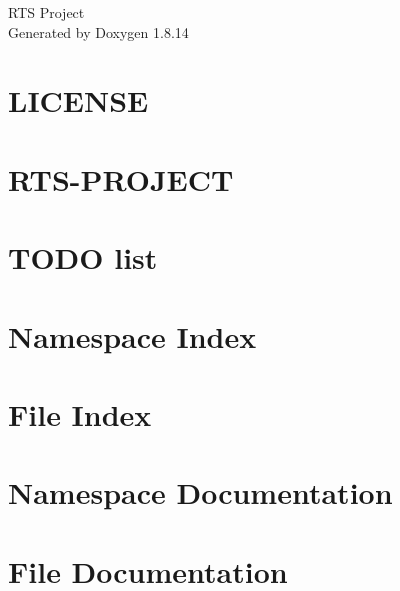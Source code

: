 \documentclass[twoside]{book}
\newcommand{\+}{\discretionary{\mbox{\scriptsize$\hookleftarrow$}}{}{}}
\newcommand{\clearemptydoublepage}{%
  \newpage{\pagestyle{empty}\cleardoublepage}%
}
\begin{document}
\begin{titlepage}
\vspace*{7cm}
\begin{center}%
{\Large R\+TS Project }\\
\vspace*{1cm}
{\large Generated by Doxygen 1.8.14}\\
\end{center}
\end{titlepage}
\clearemptydoublepage
{}
\tableofcontents
\clearemptydoublepage
{}

\chapter{L\+I\+C\+E\+N\+SE}
\label{md__l_i_c_e_n_s_e}

\chapter{R\+T\+S-\/\+P\+R\+O\+J\+E\+CT}
\label{md__r_e_a_d_m_e}

\chapter{T\+O\+DO list}
\label{md_todo}

\chapter{Namespace Index}

\chapter{File Index}

\chapter{Namespace Documentation}


















\chapter{File Documentation}





















\backmatter
\newpage
{}
\clearemptydoublepage
{}
\printindex
\end{document}
